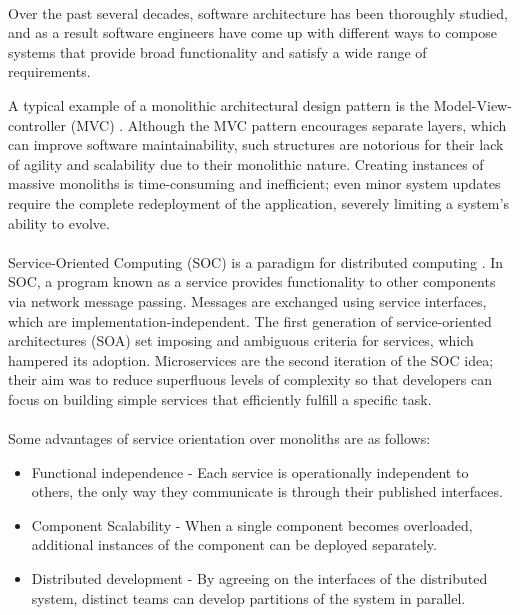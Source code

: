 \paragraph{}

Over the past several decades, software architecture has been thoroughly studied, and as a result software engineers have come up with different ways
to compose systems that provide broad functionality and satisfy a wide range of requirements.

A typical example of a monolithic architectural design pattern is the Model-View-controller (MVC) \cite{5}.
Although the MVC pattern encourages separate layers, which can improve software maintainability,
such structures are notorious for their lack of agility and scalability due to their monolithic nature.
Creating instances of massive monoliths is time-consuming and inefficient;
even minor system updates require the complete redeployment of the application, severely limiting a system's ability to evolve.

\paragraph{}

Service-Oriented Computing (SOC) is a paradigm for distributed computing \cite{6}.
In SOC, a program known as a service provides functionality to other components via network message passing.
Messages are exchanged using service interfaces, which are implementation-independent.
The first generation of service-oriented architectures (SOA) \cite{7} set imposing and ambiguous criteria for services, which hampered its adoption.
Microservices are the second iteration of the SOC idea;
their aim was to reduce superfluous levels of complexity so that developers can focus on building simple services that efficiently fulfill a specific task.

\paragraph{}

Some advantages of service orientation over monoliths are as follows:
\begin{itemize}
    \item Functional independence - Each service is operationally independent to others, the only way they communicate is through their published interfaces.
    \item Component Scalability - When a single component becomes overloaded, additional instances of the component can be deployed separately.
    \item Distributed development - By agreeing on the interfaces of the distributed system, distinct teams can develop partitions of the system in parallel.
\end{itemize}

